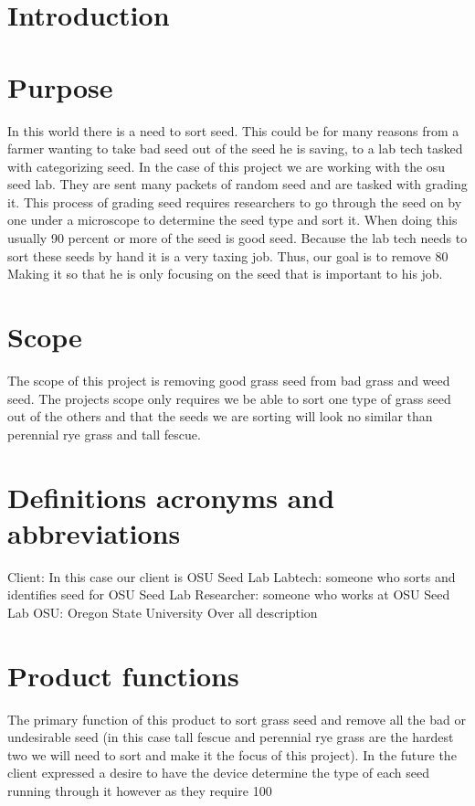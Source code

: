 \documentclass[onecolumn, draftclsnofoot,10pt, compsoc]{IEEEtran}
\begin{document}
\section{Introduction}
 \section{Purpose}
In this world there is a need to sort seed. 
This could be for many reasons from a farmer wanting to take bad seed out of the seed he is saving, to a lab tech tasked with categorizing seed.
In the case of this project we are working with the osu seed lab.
They are sent many packets of random seed and are tasked with grading it.
This process of grading seed requires researchers to go through the seed on by one under a microscope to determine the seed type and sort it.
When doing this usually 90 percent or more of the seed is good seed.
Because the lab tech needs to sort these seeds by hand it is a very taxing job.
Thus, our goal is to remove 80%
Making it so that he is only focusing on the seed that is important to his job.
 \section{Scope}
The scope of this project is removing good grass seed from bad grass and weed seed.
The projects scope only requires we be able to sort one type of grass seed out of the others and that the seeds we are sorting will look no similar than perennial rye grass and tall fescue.
 \section{Definitions acronyms and abbreviations}
Client: In this case our client is OSU Seed Lab
Labtech: someone who sorts and identifies seed for OSU Seed Lab
Researcher: someone who works at OSU Seed Lab
OSU: Oregon State University
Over all description
\section{Product functions}
The primary function of this product to sort grass seed and remove all the bad or undesirable seed (in this case tall fescue and perennial rye grass are the hardest two we will need to sort and make it the focus of this project).
In the future the client expressed a desire to have the device determine the type of each seed running through it however as they require 100%
\end{document}
